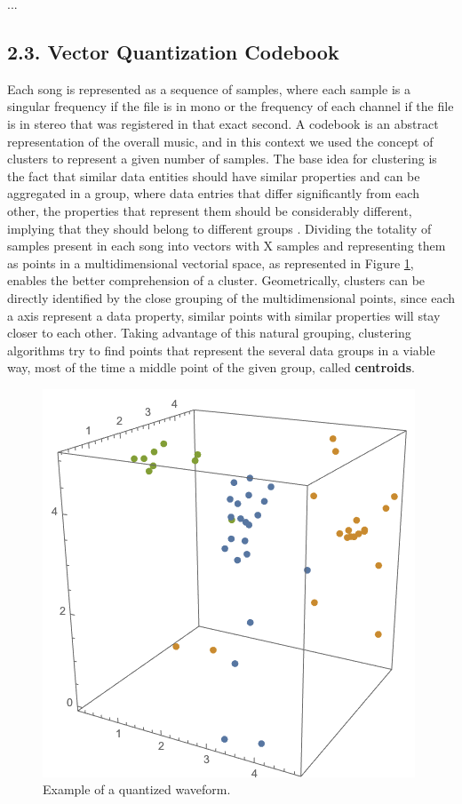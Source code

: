 \documentclass[12pt]{article}
\begin{document}
...

\subsection*{2.3. Vector Quantization Codebook}
\label{sec:vctQuantCB}

Each song is represented as a sequence of samples, where each sample is a singular frequency if the file is in mono or the frequency of each channel if the file is in stereo that was registered in that exact second. A codebook is an abstract representation of the overall music, and in this context we used the concept of clusters to represent a given number of samples.  The base idea for clustering is the fact that similar data entities should have similar properties and can be aggregated in a group, where data entries that differ significantly from each other, the properties that represent them should be considerably different, implying that they should belong to different groups \cite{clustering}. Dividing the totality of samples present in each song into vectors with X samples and representing them as points in a multidimensional vectorial space, as represented in Figure \ref{fig:pointsEx}, enables the better comprehension of a cluster. Geometrically, clusters can be directly identified by the close grouping of the multidimensional points, since each a axis represent a data property, similar points with similar properties will stay closer to each other. Taking advantage of this natural grouping, clustering algorithms try to find points that represent the several data groups in a viable way, most of the time a middle point of the given group, called \textbf{centroids}.

\begin{figure}[H]
  \centering
  \begin{minipage}{\textwidth}
    \centering
    \includegraphics[width=0.5\linewidth]{pointsEx.png}
  \end{minipage}%
  \caption{Example of a quantized waveform.}
  \label{fig:pointsEx}
\end{figure}
\end{document}
